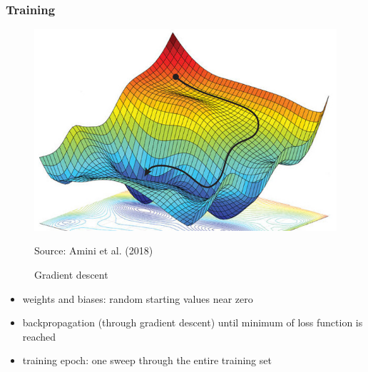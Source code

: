 \documentclass[handout]{beamer}
\begin{document}
\begin{frame}
\frametitle{Training}

\begin{center}
\begin{figure}[h]
\caption{Gradient descent}
\centering
\includegraphics[scale=0.5]{pics/gradient_descent.jpg}
\begin{minipage}{0.65\textwidth} %
{\scriptsize \hspace{20mm} Source: Amini et al. (2018) \par}
\end{minipage}
\end{figure}
\end{center}


\begin{itemize}
    \item weights and biases: random starting values near zero 
    \pause
    \item backpropagation (through gradient descent) until  minimum of loss function is reached
    \pause
    \item training epoch: one sweep through the entire training set
\end{itemize}
\end{frame}
\end{document}

